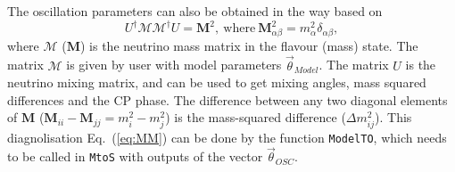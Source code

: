 \documentclass[aps,prd,nofootinbib,preprint]{revtex4}
\begin{document}
The oscillation parameters can also be obtained in the way based on
\begin{equation}\label{eq:MM}
U^\dagger\mathcal{M}\mathcal{M}^\dagger U = \mathbf{M}^2,~\text{where}~\mathbf{M}^2_{\alpha\beta}=m_\alpha^2\delta_{\alpha\beta},
\end{equation}
where $\mathcal{M}$ ($\mathbf{M}$) is the neutrino mass matrix in the flavour (mass) state. The matrix $\mathcal{M}$ is given by user with model parameters $\vec{\theta}_{Model}$. The matrix $U$ is the neutrino mixing matrix, and can be used to get mixing angles, mass squared differences and the CP phase. The difference between any two diagonal elements of $\textbf{M}$ ($\textbf{M}_{ii}-\textbf{M}_{jj}=m_i^2-m_j^2$) is the mass-squared difference ($\Delta m_{ij}^2$). This diagnolisation Eq.~(\ref{eq:MM}) can be done by the function \texttt{ModelTO}, which needs to be called in \texttt{MtoS} with outputs of the vector $\vec{\theta}_{OSC}$. 
\end{document}
